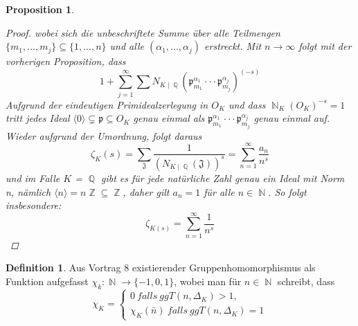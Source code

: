 \documentclass[10pt,a4paper]{article}
\theoremstyle{plain}
\newtheorem{prop}[thm]{Proposition}
\theoremstyle{definition}
\newtheorem{defn}{Definition}[section]
\theoremstyle{remark}
\DeclareMathOperator{\Q}{\mathbb{Q}}
\DeclareMathOperator{\Z}{\mathbb{Z}}
\DeclareMathOperator{\N}{\mathbb{N}}
\begin{document}
\begin{prop}
\begin{proof}
wobei sich die unbeschriftete Summe über alle Teilmengen $\{m_{1},...,m_{j}\}\subseteq \{ 1,...,n\}$ und alle $(\alpha_1,...,\alpha_j)$ erstreckt. Mit $n \rightarrow \infty$ folgt mit der vorherigen Proposition, dass $$1+\sum_{j=1}^{\infty}\sum N_{K\mid \Q}(\mathfrak{p}_{m_1}^{\alpha_1}\cdot\cdot\cdot\mathfrak{p}_{m_j}^{\alpha_j})^{(-s)}$$
Aufgrund der eindeutigen Primidealzerlegung in $O_K$ und dass $\N_K(O_K)^{-s}=1$ tritt jedes Ideal $\langle0\rangle\subsetneq \mathfrak{p} \subseteq O_{\textit{K}}$ genau einmal als $\mathfrak{p}_{m_1}^{\alpha_1}\cdot\cdot\cdot\mathfrak{p}_{m_j}^{\alpha_j}$ genau einmal auf. Wieder aufgrund der Umordnung, folgt daraus $$\zeta_{K}(s) = \sum_{\mathfrak{J}}\frac{1}{(N_{K\mid\Q}(\mathfrak{J}))^s}=\sum_{n=1}^{\infty}\frac{a_n}{n^s}$$ und im Falle $\textit{K}$ = $\Q$ gibt es für jede natürliche Zahl genau ein Ideal mit Norm n, nämlich $\langle n\rangle=n\Z\subseteq \Z$, daher gilt $a_n=1$ für alle $n\in \N$. So folgt insbesondere: $$\zeta_{K(s)}= \sum_{n=1}^{\infty}\frac{1}{n^s}$$

\end{proof}
\end{prop}

\begin{defn}

Aus Vortrag 8 existierender Gruppenhomomorphismus als Funktion aufgefasst $\chi_k \colon \N \rightarrow \{-1,0,1 \}$, wobei man für $n \in \N$ schreibt, dass $$\chi_K=\begin{cases}0 \ falls \ ggT(n,\Delta_K) >1,\\\chi_{K}(\bar{n})\ falls\ ggT(n,\Delta_K) =1\end{cases}$$

\end{defn}
\end{document}
